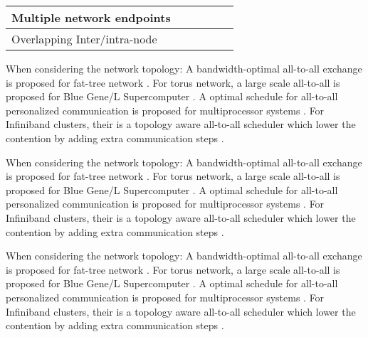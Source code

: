 \begin{table*}[t]
\begin{tabular}{|l|c|c|c|c|c|}
        Multiple network endpoints       &                                 &                              &                                     &                                                                                           &                                                                                                  \\ \hline
        Overlapping Inter/intra-node     &                                 &                              &                                     &                                                                                           &                                                                                                  \\ \hline
        \end{tabular}
\end{table*}


When considering the network topology: A bandwidth-optimal all-to-all exchange is proposed for fat-tree network \cite{prisacari2013bandwidth}. 
For torus network, a large scale all-to-all is proposed for Blue Gene/L Supercomputer \cite{kumar2008optimization}.  
A optimal schedule for all-to-all personalized communication is proposed for multiprocessor systems \cite{saha2019optimal}. 
For Infiniband clusters, their is a topology aware all-to-all scheduler which lower the contention by adding extra communication steps \cite{subramoni2014designing}.



When considering the network topology: A bandwidth-optimal all-to-all exchange is proposed for fat-tree network \cite{prisacari2013bandwidth}. 
For torus network, a large scale all-to-all is proposed for Blue Gene/L Supercomputer \cite{kumar2008optimization}.  
A optimal schedule for all-to-all personalized communication is proposed for multiprocessor systems \cite{saha2019optimal}. 
For Infiniband clusters, their is a topology aware all-to-all scheduler which lower the contention by adding extra communication steps \cite{subramoni2014designing}.



When considering the network topology: A bandwidth-optimal all-to-all exchange is proposed for fat-tree network \cite{prisacari2013bandwidth}. 
For torus network, a large scale all-to-all is proposed for Blue Gene/L Supercomputer \cite{kumar2008optimization}.  
A optimal schedule for all-to-all personalized communication is proposed for multiprocessor systems \cite{saha2019optimal}. 
For Infiniband clusters, their is a topology aware all-to-all scheduler which lower the contention by adding extra communication steps \cite{subramoni2014designing}.



